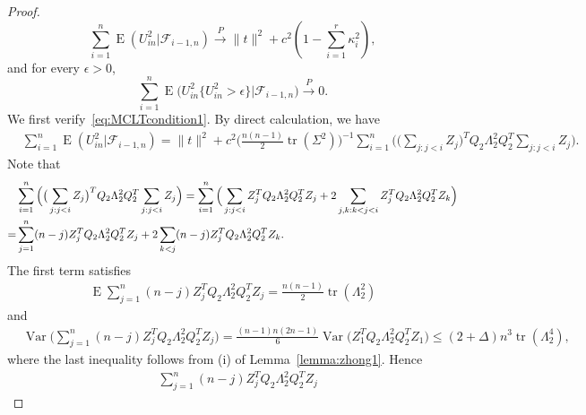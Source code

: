 \documentclass[3p]{elsarticle}
\DeclareMathOperator{\mytr}{tr}
\DeclareMathOperator{\myE}{E}
\DeclareMathOperator{\myVar}{Var}
\theoremstyle{plain}
\theoremstyle{definition}
\theoremstyle{remark}
\begin{document}
\begin{proof}
     \begin{equation}\label{eq:MCLTcondition1}
         \sum_{i=1}^n \myE(U_{in}^2 |\mathcal{F}_{i-1,n})\xrightarrow{P} \|t\|^2 + c^2(1-\sum_{i=1}^r \kappa_i^2),
     \end{equation}
     and for every $\epsilon>0$,
     \begin{equation}\label{eq:MCLTcondition2}
         \sum_{i=1}^n \myE\big(U_{in}^2\big\{U_{in}^2>\epsilon \big\}\big|\mathcal{F}_{i-1,n}\big)\xrightarrow{P} 0.
     \end{equation}
    We first verify~\eqref{eq:MCLTcondition1}. By direct calculation, we have
     $$
     \begin{aligned}
         &\sum_{i=1}^n \myE(U_{in}^2 |\mathcal{F}_{i-1,n})    
     =\|t\|^2+c^2 \big(\frac{n(n-1)}{2} \mytr(\Sigma^2)\big)^{-1}\sum_{i=1}^n \Big(\big(\sum_{j:j<i} Z_{j}\big)^T Q_2 \Lambda_2^2 Q_2^T \sum_{j:j<i} Z_{j}\Big).
     \end{aligned}
     $$
     Note that
     \begin{align}
         &\sum_{i=1}^n \Big(\big(\sum_{j:j<i} Z_{j}\big)^T Q_2 \Lambda_2^2 Q_2^T \sum_{j:j<i} Z_{j}\Big)
         =
    \sum_{i=1}^n \Big(
         \sum_{j:j<i} Z_{j}^T Q_2 \Lambda_2^2 Q_2^T  Z_{j}
         +
         2\sum_{j,k:k<j<i}Z_{j}^T Q_2 \Lambda_2^2 Q_2^T  Z_{k}
         \Big)
         \notag
         \\
         =&
         \sum_{j=1}^{n} (n-j) Z_{j}^T Q_2 \Lambda_2^2 Q_2^T  Z_{j}
         +
         2\sum_{k<j} (n-j) Z_{j}^T Q_2 \Lambda_2^2 Q_2^T  Z_{k}
         .
         \label{eq:shiwu}
     \end{align}
     The first term satisfies
     $$
     \begin{aligned}
\myE\sum_{j=1}^{n} (n-j) Z_{j}^T Q_2 \Lambda_2^2 Q_2^T  Z_{j}=
         \frac{n(n-1)}{2}\mytr (\Lambda_2^2)
     \end{aligned}
     $$
     and
     $$
     \begin{aligned}
         &\myVar\Big(\sum_{j=1}^{n} (n-j) Z_{j}^T Q_2 \Lambda_2^2 Q_2^T  Z_{j}\Big)=
         \frac{(n-1)n(2n-1)}{6}
         \myVar\big( Z_{1}^T Q_2 \Lambda_2^2 Q_2^T  Z_{1}\big)
         \leq (2+\Delta)
         n^3\mytr(\Lambda_2^4),
     \end{aligned}
     $$
     where the last inequality follows from (i) of Lemma~\ref{lemma:zhong1}.
     Hence
     \begin{equation}\label{eq:shiwu2}
     \begin{aligned}
         &
         {\sum_{j=1}^{n} (n-j) Z_{j}^T Q_2 \Lambda_2^2 Q_2^T  Z_{j}}

\end{aligned}
\end{equation}
\end{proof}
\end{document}
